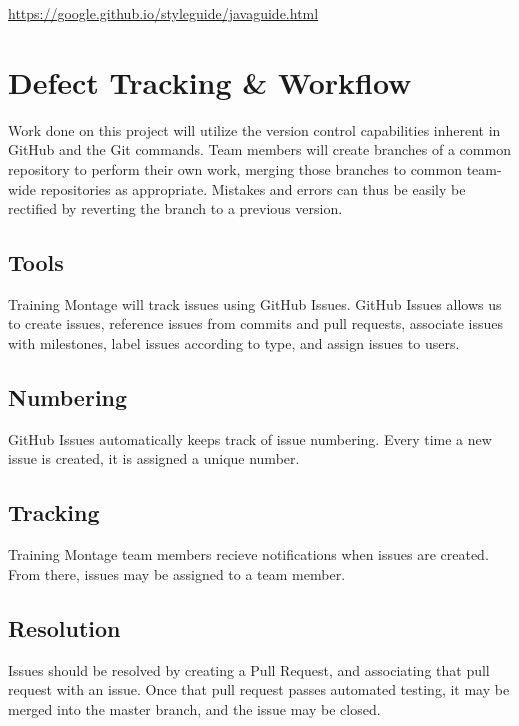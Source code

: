 \documentclass{scrreprt}
\begin{document}
\url{https://google.github.io/styleguide/javaguide.html}

\section{Defect Tracking \& Workflow}
Work done on this project will utilize the version control capabilities inherent in GitHub and the Git commands.  Team members will create branches of a common repository to perform their own work, merging those branches to common team-wide repositories as appropriate.  Mistakes and errors can thus be easily be rectified by reverting the branch to a previous version.

\subsection{Tools}
Training Montage will track issues using GitHub Issues. GitHub Issues allows us to create issues, reference issues from commits and pull requests, associate issues with milestones, label issues according to type, and assign issues to users.

\subsection{Numbering}
GitHub Issues automatically keeps track of issue numbering. Every time a new issue is created, it is assigned a unique number.

\subsection{Tracking}
Training Montage team members recieve notifications when issues are created. From there, issues may be assigned to a team member.

\subsection{Resolution}
Issues should be resolved by creating a Pull Request, and associating that pull request with an issue. Once that pull request passes automated testing, it may be merged into the master branch, and the issue may be closed.
\end{document}
